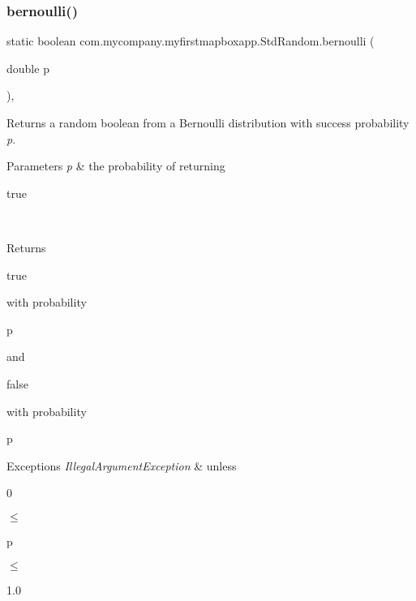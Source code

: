\subsubsection{\texorpdfstring{bernoulli()}{bernoulli()}\hspace{0.1cm}{\footnotesize\ttfamily [1/2]}}
{\footnotesize\ttfamily static boolean com.\+mycompany.\+myfirstmapboxapp.\+Std\+Random.\+bernoulli (\begin{DoxyParamCaption}\item[{double}]{p }\end{DoxyParamCaption})\hspace{0.3cm}{\ttfamily [inline]}, {\ttfamily [static]}}

Returns a random boolean from a Bernoulli distribution with success probability {\itshape p}.


\begin{DoxyParams}{Parameters}
{\em p} & the probability of returning
\begin{DoxyCode}
\textcolor{keyword}{true} 
\end{DoxyCode}
 \\
\hline
\end{DoxyParams}
\begin{DoxyReturn}{Returns}

\begin{DoxyCode}
\textcolor{keyword}{true} 
\end{DoxyCode}
 with probability
\begin{DoxyCode}
p 
\end{DoxyCode}
 and 
\begin{DoxyCode}
\textcolor{keyword}{false} 
\end{DoxyCode}
 with probability
\begin{DoxyCode}
p 
\end{DoxyCode}
 
\end{DoxyReturn}

\begin{DoxyExceptions}{Exceptions}
{\em Illegal\+Argument\+Exception} & unless
\begin{DoxyCode}
0 
\end{DoxyCode}
 {$\le$}
\begin{DoxyCode}
p 
\end{DoxyCode}
 {$\le$}
\begin{DoxyCode}
1.0 
\end{DoxyCode}
 \\
\hline
\end{DoxyExceptions}
\mbox{\label{classcom_1_1mycompany_1_1myfirstmapboxapp_1_1_std_random_a73c78d568b6155babc555c43c1b1dcf4}} 
